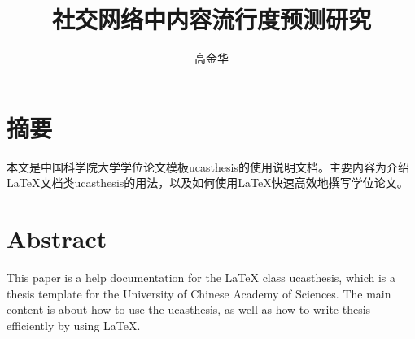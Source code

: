   \confidential{}%
  \title[博士学位论文]{社交网络中内容流行度预测研究}%
  \author{高金华}%
\maketitle
\makeenglishtitle
\makedeclaration
\chapter{摘\quad 要}%
本文是中国科学院大学学位论文模板ucasthesis的使用说明文档。主要内容为介绍\LaTeX{}文档类ucasthesis的用法，以及如何使用\LaTeX{}快速高效地撰写学位论文。



\chapter{Abstract}%
This paper is a help documentation for the \LaTeX{} class ucasthesis, which is  a thesis template for the University of Chinese Academy of Sciences. The main content is about how to use the ucasthesis, as well as how to write thesis efficiently by using \LaTeX{}.


